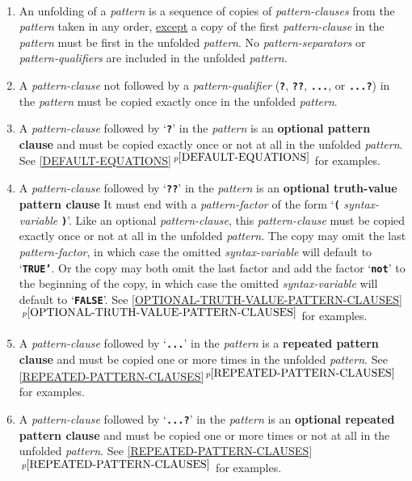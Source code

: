 \documentclass[12pt]{article}
\newcommand{\TT}[1]{{\tt \bfseries #1}}
\newcommand{\key}[1]{{\rm \bfseries #1}}
\newcommand{\ttkey}[1]{{\tt \bfseries #1}}
\newcommand{\itemref}[1]{\ref{#1}$\,^{p\pageref{#1}}$}
\newenvironment{indpar}[1][0.3in]%
	{\begin{list}{}%
		     {\setlength{\itemsep}{0in}%
		      \setlength{\topsep}{0in}%
		      \setlength{\parsep}{1ex}%
		      \setlength{\labelwidth}{#1}%
		      \setlength{\leftmargin}{#1}%
		      \addtolength{\leftmargin}{\labelsep}}%
	 \item}%
	{\end{list}}
\begin{document}
\begin{indpar}
\begin{list}{}{}
\item[\key{Pattern Unfolding Rules}%
	   \index{unfolding rules}%
	   \label{PATTERN-UNFOLDING-RULES}:]~

\begin{enumerate}

\item An unfolding of a {\em pattern} is a sequence of copies of
{\em pattern-clauses} from the {\em pattern} taken in any order,
\underline{except} a copy of the first {\em pattern-clause} in the
{\em pattern} must be first in the unfolded {\em pattern}.
No {\em pattern-separators} or {\em pattern-qualifiers} are included
in the unfolded {\em pattern}.

\item A {\em pattern-clause} not followed by a {\em pattern-qualifier}
(\TT{?}, \TT{??}, \TT{...}, or \TT{...?})
in the {\em pattern} must be copied exactly
once in the unfolded {\em pattern}.

\item A {\em pattern-clause} followed by `\TT{?}'
in the {\em pattern} is an \key{optional pattern clause}
and must be copied exactly once or not at all
in the unfolded {\em pattern}.
See \itemref{DEFAULT-EQUATIONS} for examples.

\item\label{OPTIONAL-TRUTH-VALUE-CLAUSE-RULE}
A {\em pattern-clause} followed by `\TT{??}'
in the {\em pattern} is an
\key{optional truth-value pattern clause}
It must end with a {\em pattern-factor} of the form
`\TT{(} {\em syntax-variable} \TT{)}'.
Like an optional {\em pattern-clause}, this {\em pattern-clause}
must be copied exactly once or not at all
in the unfolded {\em pattern}.  The copy may omit the last
{\em pattern-factor}, in which case the omitted {\em syntax-variable}
will default to `\TT{TRUE'}.
Or the copy may both omit the last factor and add the factor
`\ttkey{not}' to the beginning
of the copy, in which case the omitted {\em syntax-variable}
will default to `\TT{FALSE}'.
See \itemref{OPTIONAL-TRUTH-VALUE-PATTERN-CLAUSES} for examples.

\item A {\em pattern-clause} followed by `\TT{...}'
in the {\em pattern} is a \key{repeated pattern clause}
and must be copied one or more times
in the unfolded {\em pattern}.
See \itemref{REPEATED-PATTERN-CLAUSES} for examples.

\item A {\em pattern-clause} followed by `\TT{...?}'
in the {\em pattern} is an \key{optional repeated pattern clause}
and must be copied one or more times or not at all
in the unfolded {\em pattern}.
See \itemref{REPEATED-PATTERN-CLAUSES} for examples.


\end{enumerate}
\end{list}
\end{indpar}
\end{document}
